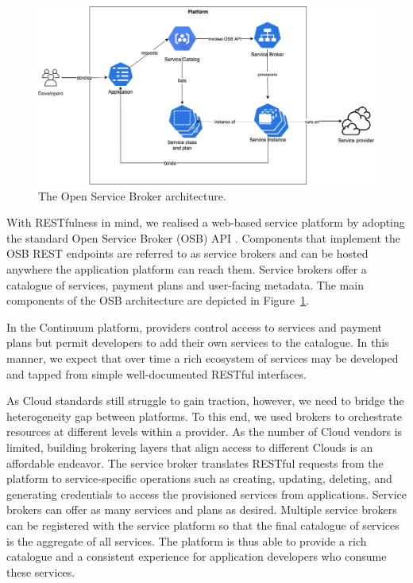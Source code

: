 \begin{figure}[ht]
\centering
\includegraphics[width=\columnwidth]{figures/osb}
\caption{The Open Service Broker architecture.} \label{fig:osb}
\end{figure}

With RESTfulness in mind, we realised a web-based service platform by adopting the standard Open Service Broker (OSB) API \cite{osb}. Components that implement the OSB REST endpoints are referred to as service brokers and can be hosted anywhere the application platform can reach them. Service brokers offer a catalogue of services, payment plans and user-facing metadata. The main components of the OSB architecture are depicted in Figure~\ref{fig:osb}.

In the Continuum platform, providers control access to services and payment plans but permit developers to add their own services to the catalogue. In this manner, we expect that over time a rich ecosystem of services may be developed and tapped from simple well-documented RESTful interfaces.

As Cloud standards still struggle to gain traction, however, we need to bridge the heterogeneity gap between platforms. 
To this end, we used brokers to orchestrate resources at different levels within a provider. As the number of Cloud vendors is limited, building brokering layers that align access to different Clouds is an affordable endeavor. The service broker translates RESTful requests from the platform to service-specific operations such as creating, updating, deleting, and generating credentials to access the provisioned services from applications. Service brokers can offer as many services and plans as desired. Multiple service brokers can be registered with the service platform so that the final catalogue of services is the aggregate of all services. The platform is thus able to provide a rich catalogue and a consistent experience for application developers who consume these services.

